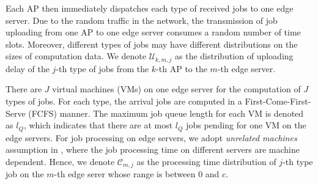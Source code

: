 Each AP then immediately dispatches each type of received jobs to one edge server.
Due to the random traffic in the network, the transmission of job uploading from one AP to one edge server consumes a random number of time slots. Moreover, different types of jobs may have different distributions on the sizes of computation data.
We denote $\mathcal{U}_{k,m,j}$ as the distribution of uploading delay of the $j$-th type of jobs from the $k$-th AP to the $m$-th edge server.

There are $J$ virtual machines (VMs) on one edge server for the computation of $J$ types of jobs.
For each type, the arrival jobs are computed in a First-Come-First-Serve (FCFS) manner.
The maximum job queue length for each VM is denoted as $l_Q$, which indicates that there are at most $l_Q$ jobs pending for one VM on the edge servers. 
For job processing on edge servers, we adopt \emph{unrelated machines} assumption in \cite{tan-online}, where the job processing time on different servers are machine dependent. %
Hence, we denote $\mathcal{C}_{m,j}$ as the processing time distribution  of $j$-th type job on the $m$-th edge serer whose range is between $0$ and $c$.

